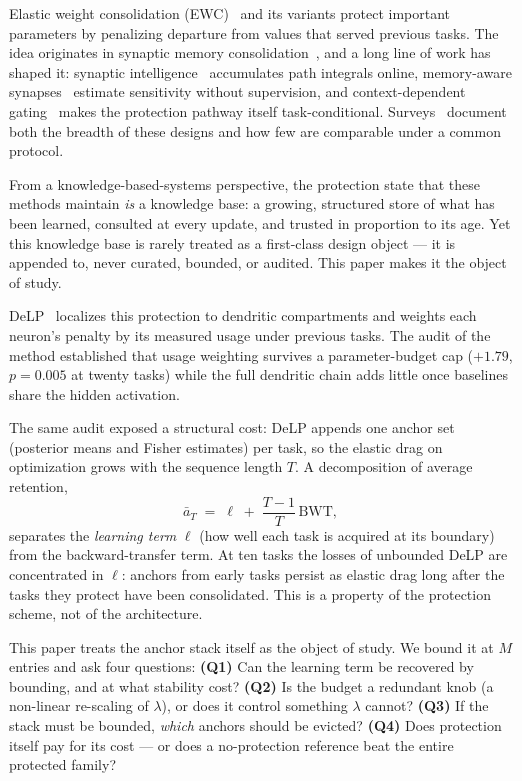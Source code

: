 \documentclass[review,11pt,number]{elsarticle}
\newcommand{\delp}{DeLP}
\begin{document}
Elastic weight consolidation (EWC)~\cite{kirkpatrick2017} and its
variants protect important parameters by penalizing departure from
values that served previous tasks. The idea originates in synaptic
memory consolidation~\cite{benna2016}, and a long line of work has
shaped it: synaptic intelligence~\cite{zenke2017} accumulates path
integrals online, memory-aware synapses~\cite{aljundi2018} estimate
sensitivity without supervision, and context-dependent
gating~\cite{masse2018} makes the protection pathway itself
task-conditional. Surveys~\cite{parisi2019,delange2022} document both
the breadth of these designs and how few are comparable under a common
protocol.

From a knowledge-based-systems perspective, the protection state that
these methods maintain \emph{is} a knowledge base: a growing, structured
store of what has been learned, consulted at every update, and
trusted in proportion to its age. Yet this knowledge base is rarely
treated as a first-class design object --- it is appended to, never
curated, bounded, or audited. This paper makes it the object of study.

\delp{}~\cite{zhou2026delp} localizes this protection to dendritic
compartments and weights each neuron's penalty by its measured usage
under previous tasks. The audit of the method established that usage
weighting survives a parameter-budget cap ($+1.79$, $p{=}0.005$ at
twenty tasks) while the full dendritic chain adds little once baselines
share the hidden activation.

The same audit exposed a structural cost: \delp{} appends one anchor
set (posterior means and Fisher estimates) per task, so the elastic
drag on optimization grows with the sequence length $T$. A decomposition
of average retention,
%
\begin{equation}
\label{eq:decomp}
\bar a_T \;=\; \ell \;+\; \frac{T-1}{T}\,\mathrm{BWT},
\end{equation}
%
separates the \emph{learning term} $\ell$ (how well each task is
acquired at its boundary) from the backward-transfer term. At ten tasks
the losses of unbounded \delp{} are concentrated in $\ell$: anchors
from early tasks persist as elastic drag long after the tasks they
protect have been consolidated. This is a property of the protection
scheme, not of the architecture.


This paper treats the anchor stack itself as the object of study.
We bound it at $M$ entries and ask four questions:
\textbf{(Q1)} Can the learning term be recovered by bounding, and at
what stability cost?
\textbf{(Q2)} Is the budget a redundant knob (a non-linear re-scaling
of $\lambda$), or does it control something $\lambda$ cannot?
\textbf{(Q3)} If the stack must be bounded, \emph{which} anchors should
be evicted?
\textbf{(Q4)} Does protection itself pay for its cost --- or does a
no-protection reference beat the entire protected family?
\end{document}
